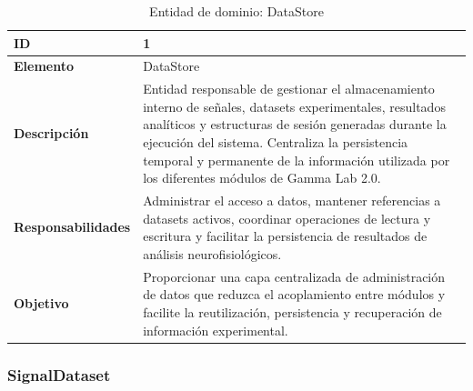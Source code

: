 \documentclass[12pt, letterpaper]{article}
\begin{document}
\begin{table}[H]
\centering

\begin{tabularx}{\textwidth}{|
>{}p{3.9cm}|
Y|
}

\hline
\textbf{ID} & 1 \\ \hline

\textbf{Elemento} & DataStore \\ \hline

\textbf{Descripción}
&
Entidad responsable de gestionar el almacenamiento interno de señales,
datasets experimentales, resultados analíticos y estructuras de sesión
generadas durante la ejecución del sistema. Centraliza la persistencia
temporal y permanente de la información utilizada por los diferentes
módulos de Gamma Lab 2.0.
\\ \hline

\textbf{Responsabilidades}
&
Administrar el acceso a datos, mantener referencias a datasets activos,
coordinar operaciones de lectura y escritura y facilitar la persistencia
de resultados de análisis neurofisiológicos.
\\ \hline

\textbf{Objetivo}
&
Proporcionar una capa centralizada de administración de datos que reduzca
el acoplamiento entre módulos y facilite la reutilización, persistencia y
recuperación de información experimental.
\\ \hline

\end{tabularx}

\caption{Entidad de dominio: DataStore}
\label{tab:datastore}

\end{table}

\subsubsection{SignalDataset}
\end{document}
